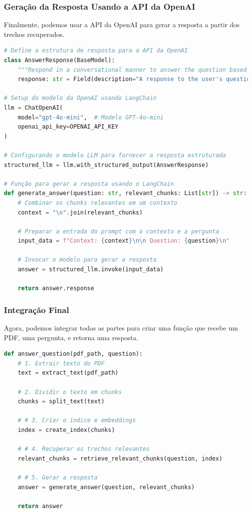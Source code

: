 \documentclass[12 pt]{article}
\begin{document}
\subsubsection*{Geração da Resposta Usando a API da OpenAI}
Finalmente, podemos usar a API da OpenAI para gerar a resposta a partir dos trechos recuperados.
\begin{lstlisting}[language=Python]
# Define a estrutura de resposta para a API da OpenAI
class AnswerResponse(BaseModel):
    """Respond in a conversational manner to answer the question based on the context provided."""
    response: str = Field(description="A response to the user's question based on the context provided")

# Setup do modelo da OpenAI usando LangChain
llm = ChatOpenAI(
    model="gpt-4o-mini",  # Modelo GPT-4o-mini
    openai_api_key=OPENAI_API_KEY
)

# Configurando o modelo LLM para fornecer a resposta estruturada
structured_llm = llm.with_structured_output(AnswerResponse)

# Função para gerar a resposta usando o LangChain
def generate_answer(question: str, relevant_chunks: List[str]) -> str:
    # Combinar os chunks relevantes em um contexto
    context = "\n".join(relevant_chunks)
    
    # Preparar a entrada do prompt com o contexto e a pergunta
    input_data = f"Context: {context}\n\n Question: {question}\n"

    # Invocar o modelo para gerar a resposta
    answer = structured_llm.invoke(input_data)
    
    return answer.response
\end{lstlisting}
\subsubsection*{Integração Final}
Agora, podemos integrar todas as partes para criar uma função que recebe um PDF, uma pergunta, e retorna uma resposta.
\begin{lstlisting}[language=Python]
def answer_question(pdf_path, question):
    # 1. Extrair texto do PDF
    text = extract_text(pdf_path)
    
    # 2. Dividir o texto em chunks
    chunks = split_text(text)

    # # 3. Criar o índice e embeddings
    index = create_index(chunks)
    
    # # 4. Recuperar os trechos relevantes
    relevant_chunks = retrieve_relevant_chunks(question, index)
    
    # # 5. Gerar a resposta
    answer = generate_answer(question, relevant_chunks)
    
    return answer
\end{lstlisting}
\end{document}
